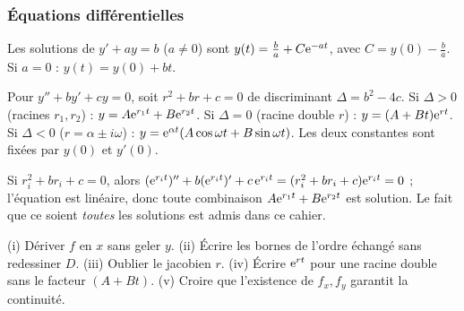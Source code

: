 \subsubsection*{Équations différentielles}
\begin{propriete}[Ordre 1]
Les solutions de $y'+ay=b$ ($a\ne0$) sont $y(t)=\frac ba+C\mathrm{e}^{-at}$, avec $C=y(0)-\frac ba$. Si $a=0$ : $y(t)=y(0)+bt$.
\end{propriete}
\begin{propriete}
Pour $y''+by'+cy=0$, soit $r^2+br+c=0$ de discriminant $\Delta=b^2-4c$. Si $\Delta>0$ (racines $r_1,r_2$) : $y=A\mathrm{e}^{r_1t}+B\mathrm{e}^{r_2t}$. Si $\Delta=0$ (racine double $r$) : $y=(A+Bt)\mathrm{e}^{rt}$. Si $\Delta<0$ ($r=\alpha\pm i\omega$) : $y=\mathrm{e}^{\alpha t}(A\cos\omega t+B\sin\omega t)$. Les deux constantes sont fixées par $y(0)$ et $y'(0)$.
\end{propriete}
\begin{demonstration}
Si $r_i^2+br_i+c=0$, alors $(\mathrm{e}^{r_it})''+b(\mathrm{e}^{r_it})'+c\,\mathrm{e}^{r_it}=(r_i^2+br_i+c)\mathrm{e}^{r_it}=0$ ; l'équation est linéaire, donc toute combinaison $A\mathrm{e}^{r_1t}+B\mathrm{e}^{r_2t}$ est solution. Le fait que ce soient \emph{toutes} les solutions est admis dans ce cahier.
\end{demonstration}
\begin{piege}
(i) Dériver $f$ en $x$ sans geler $y$. (ii) Écrire les bornes de l'ordre échangé sans redessiner $D$. (iii) Oublier le jacobien $r$. (iv) Écrire $\mathrm{e}^{rt}$ pour une racine double sans le facteur $(A+Bt)$. (v) Croire que l'existence de $f_x,f_y$ garantit la continuité.
\end{piege}

